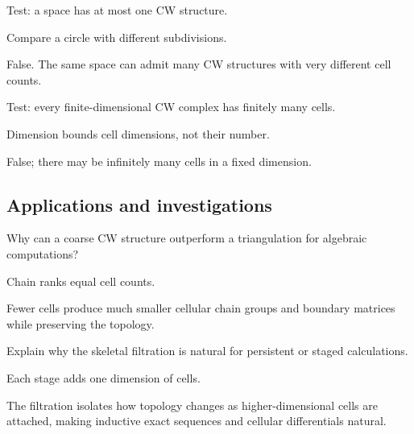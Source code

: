 \begin{exercise}\label{exr:viii06-ped-11}
Test: a space has at most one CW structure.
\end{exercise}
\begin{hint}
Compare a circle with different subdivisions.
\end{hint}
\begin{solution}
False. The same space can admit many CW structures with very different cell counts.
\end{solution}

\begin{exercise}\label{exr:viii06-ped-12}
Test: every finite-dimensional CW complex has finitely many cells.
\end{exercise}
\begin{hint}
Dimension bounds cell dimensions, not their number.
\end{hint}
\begin{solution}
False; there may be infinitely many cells in a fixed dimension.
\end{solution}

\subsection*{Applications and investigations}

\begin{exercise}\label{exr:viii06-ped-13}
Why can a coarse CW structure outperform a triangulation for algebraic computations?
\end{exercise}
\begin{hint}
Chain ranks equal cell counts.
\end{hint}
\begin{solution}
Fewer cells produce much smaller cellular chain groups and boundary matrices while preserving the topology.
\end{solution}

\begin{exercise}\label{exr:viii06-ped-14}
Explain why the skeletal filtration is natural for persistent or staged calculations.
\end{exercise}
\begin{hint}
Each stage adds one dimension of cells.
\end{hint}
\begin{solution}
The filtration isolates how topology changes as higher-dimensional cells are attached, making inductive exact sequences and cellular differentials natural.
\end{solution}

